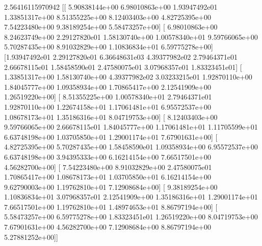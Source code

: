 \documentclass[letterpaper,10pt,english]{sphinxmanual}
\begin{document}
\begin{sphinxVerbatim}[commandchars=\\\{\}]
2.56416115970942
[[ 5.90838144e+00  6.98010863e+00 \PYGZhy{}1.93947492e\PYGZhy{}01  1.33851317e+00
   8.51355225e+00  8.12403403e+00  4.82725395e+00  7.54223480e+00
   9.38189254e+00  5.58473257e+00]
 [ 6.98010863e+00  8.24623749e+00 \PYGZhy{}2.29127820e\PYGZhy{}01  1.58130740e+00
   1.00578340e+01  9.59766065e+00  5.70287435e+00  8.91032829e+00
   1.10836834e+01  6.59775278e+00]
 [\PYGZhy{}1.93947492e\PYGZhy{}01 \PYGZhy{}2.29127820e\PYGZhy{}01  6.36648631e\PYGZhy{}03 \PYGZhy{}4.39377982e\PYGZhy{}02
  \PYGZhy{}2.79464371e\PYGZhy{}01 \PYGZhy{}2.66678115e\PYGZhy{}01 \PYGZhy{}1.58458590e\PYGZhy{}01 \PYGZhy{}2.47580075e\PYGZhy{}01
  \PYGZhy{}3.07968357e\PYGZhy{}01 \PYGZhy{}1.83323451e\PYGZhy{}01]
 [ 1.33851317e+00  1.58130740e+00 \PYGZhy{}4.39377982e\PYGZhy{}02  3.03233215e\PYGZhy{}01
   1.92870110e+00  1.84045777e+00  1.09358934e+00  1.70865417e+00
   2.12541909e+00  1.26519220e+00]
 [ 8.51355225e+00  1.00578340e+01 \PYGZhy{}2.79464371e\PYGZhy{}01  1.92870110e+00
   1.22674158e+01  1.17061481e+01  6.95572537e+00  1.08678173e+01
   1.35186316e+01  8.04719753e+00]
 [ 8.12403403e+00  9.59766065e+00 \PYGZhy{}2.66678115e\PYGZhy{}01  1.84045777e+00
   1.17061481e+01  1.11705599e+01  6.63748198e+00  1.03705850e+01
   1.29001174e+01  7.67901631e+00]
 [ 4.82725395e+00  5.70287435e+00 \PYGZhy{}1.58458590e\PYGZhy{}01  1.09358934e+00
   6.95572537e+00  6.63748198e+00  3.94395333e+00  6.16214154e+00
   7.66517501e+00  4.56282700e+00]
 [ 7.54223480e+00  8.91032829e+00 \PYGZhy{}2.47580075e\PYGZhy{}01  1.70865417e+00
   1.08678173e+01  1.03705850e+01  6.16214154e+00  9.62790003e+00
   1.19762810e+01  7.12908684e+00]
 [ 9.38189254e+00  1.10836834e+01 \PYGZhy{}3.07968357e\PYGZhy{}01  2.12541909e+00
   1.35186316e+01  1.29001174e+01  7.66517501e+00  1.19762810e+01
   1.48974653e+01  8.86797194e+00]
 [ 5.58473257e+00  6.59775278e+00 \PYGZhy{}1.83323451e\PYGZhy{}01  1.26519220e+00
   8.04719753e+00  7.67901631e+00  4.56282700e+00  7.12908684e+00
   8.86797194e+00  5.27881252e+00]]
\end{sphinxVerbatim}
\end{document}
